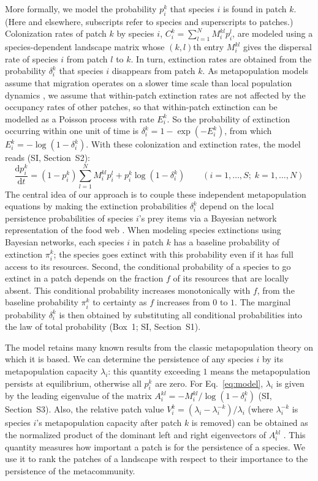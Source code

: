\documentclass[11pt]{article}
\newcommand{\ud}{\text{d}}
\newcommand{\SI}{SI}
\begin{document}
More formally, we model the probability $p_i^k$ that species $i$ is found in patch $k$. (Here and elsewhere, subscripts refer to species and superscripts to patches.) Colonization rates of patch $k$ by species $i$, $C_i^k = \sum_{l=1}^N M_i^{kl} p_i^l$, are modeled using a species-dependent landscape matrix whose $(k,l)$th entry $M_i^{kl}$ gives the dispersal rate of species $i$ from patch $l$ to $k$. In turn, extinction rates are obtained from the probability $\delta_i^k$ that species $i$ disappears from patch $k$. As metapopulation models assume that migration operates on a slower time scale than local population dynamics \citep{Hanski1994}, we assume that within-patch extinction rates are not affected by the occupancy rates of other patches, so that within-patch extinction can be modelled as a Poisson process with rate $E_i^k$. So the probability of extinction occurring within one unit of time is $\delta_i^k = 1 - \exp(-E_i^k)$, from which $E_i^k = -\log(1-\delta_i^k)$. With these colonization and extinction rates, the model reads (\SI, Section~S2):
\begin{equation}
  \label{eq:model}
  \frac{\ud p_i^k}{\ud t} = (1 - p_i^k) \sum_{l=1}^N M_i^{kl} p_i^l +
  p_i^k \log(1 - \delta_i^k) \qquad (i = 1, \ldots, S; \; k = 1, \ldots, N)
\end{equation}
The central idea of our approach is to couple these independent metapopulation equations by making the extinction probabilities $\delta_i^k$ depend on the local persistence probabilities of species $i$'s prey items via a Bayesian network representation of the food web \citep{Eklofetal2013MEE}. When modeling species extinctions using Bayesian networks, each species $i$ in patch $k$ has a baseline probability of extinction $\pi_i^k$; the species goes extinct with this probability even if it has full access to its resources. Second, the conditional probability of a species to go extinct in a patch depends on the fraction $f$ of its resources that are locally absent. This conditional probability increases monotonically with $f$, from the baseline probability $\pi_i^k$ to certainty as $f$ increases from $0$ to $1$. The marginal probability $\delta_i^k$ is then obtained by substituting all conditional probabilities into the law of total probability (Box~1; \SI, Section~S1).

The model retains many known results from the classic metapopulation theory on which it is based. We can determine the persistence of any species $i$ by its metapopulation capacity $\lambda_i$: this quantity exceeding $1$ means the metapopulation persists at equilibrium, otherwise all $p_i^k$ are zero. For Eq.~\ref{eq:model}, $\lambda_i$ is given by the leading eigenvalue of the matrix $A_i^{kl} = -M_i^{kl} / \log(1 - \delta_i^k)$ (\SI, Section~S3). Also, the relative patch value $V_i^k = (\lambda_i - \lambda_i^{-k})/\lambda_i$ (where $\lambda_i^{-k}$ is species $i$'s metapopulation capacity after patch $k$ is removed) can be obtained as the normalized product of the dominant left and right eigenvectors of $A_i^{kl}$ \citep{OvaskainenHanski2001}. This quantity measures how important a patch is for the persistence of a species. We use it to rank the patches of a landscape with respect to their importance to the persistence of the metacommunity.
\end{document}

